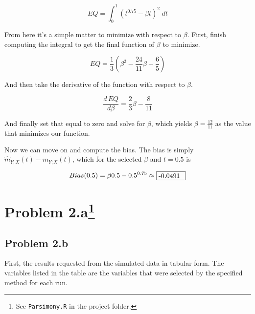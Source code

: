 \documentclass[letter]{article}
\newcounter{foot}
\begin{document}
\begin{equation}
	EQ = \int _0 ^1 (t^{0.75} - \beta t)^2 \; dt
\end{equation}

From here it's a simple matter to minimize with respect to $\beta$. First, finish computing the integral to get the final function of $\beta$ to minimize.

\begin{equation}
	EQ = \frac{1}{3}(\beta^2 - \frac{24}{11}\beta + \frac{6}{5})
\end{equation}

And then take the derivative of the function with respect to $\beta$.

\begin{equation}
	\frac{d\,EQ}{d\beta} = \frac{2}{3}\beta - \frac{8}{11}
\end{equation}

And finally set that equal to zero and solve for $\beta$, which yields $\beta=\frac{12}{11}$ as the value that minimizes our function.

Now we can move on and compute the bias. The bias is simply $\hat{m}_{Y;X}(t) - m_{Y;X}(t)$, which for the selected $\beta$ and $t=0.5$ is

\begin{equation}
	Bias(0.5) = \beta 0.5 - 0.5^{0.75} \approx {\fbox {\parbox{0.5in}{-0.0491}}}
\end{equation}


\section*{Problem 2.a\footnote{See \texttt{Parsimony.R} in the project folder.}}






%


\subsection*{Problem 2.b}

First, the results requested from the simulated data in tabular form. The variables listed in the table are the variables that were selected by the specified method for each run.
\end{document}
